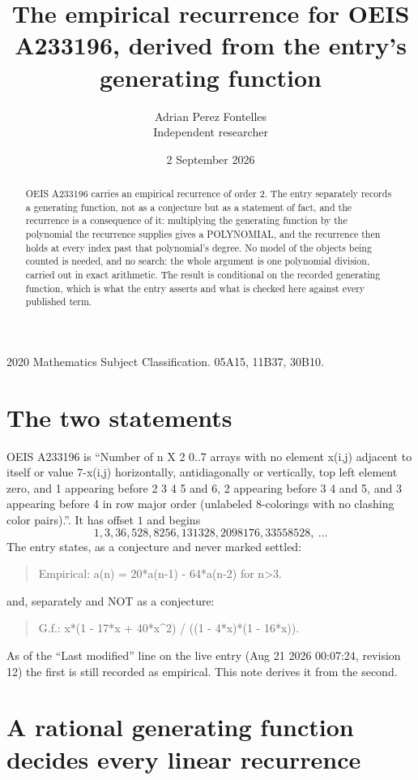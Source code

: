 \documentclass[11pt,a4paper]{article}
\title{The empirical recurrence for OEIS A233196, derived from the entry's generating function}
\author{Adrian Perez Fontelles\\ \small Independent researcher}
\date{2 September 2026}
\theoremstyle{plain}
\theoremstyle{definition}
\begin{document}
\maketitle

\begin{abstract}
OEIS A233196 carries an empirical recurrence of order $2$. The entry separately records a
generating function, not as a conjecture but as a statement of fact, and the recurrence is a
consequence of it: multiplying the generating function by the polynomial the recurrence
supplies gives a POLYNOMIAL, and the recurrence then holds at every index past that
polynomial's degree. No model of the objects being counted is needed, and no search: the
whole argument is one polynomial division, carried out in exact arithmetic. The result is
conditional on the recorded generating function, which is what the entry asserts and what is
checked here against every published term.
\end{abstract}

\noindent\small 2020 Mathematics Subject Classification. 05A15, 11B37, 30B10.\normalsize

\section{The two statements}

OEIS A233196 is ``Number of n X 2 0..7 arrays with no element x(i,j) adjacent to itself or value 7-x(i,j) horizontally, antidiagonally or vertically, top left element zero, and 1 appearing before 2 3 4 5 and 6, 2 appearing before 3 4 and 5, and 3 appearing before 4 in row major order (unlabeled 8-colorings with no clashing color pairs).''. It has offset $1$ and begins
\[
1, 3, 36, 528, 8256, 131328, 2098176, 33558528,\ \dots
\]
The entry states, as a conjecture and never marked settled:
\begin{quote}
Empirical: a(n) = 20*a(n-1) - 64*a(n-2) for n>3.
\end{quote}
and, separately and NOT as a conjecture:
\begin{quote}
G.f.: x*(1 - 17*x + 40*x\^{}2) / ((1 - 4*x)*(1 - 16*x)).
\end{quote}
As of the ``Last modified'' line on the live entry (Aug 21 2026 00:07:24, revision 12) the first is still
recorded as empirical. This note derives it from the second.

\section{A rational generating function decides every linear recurrence}
\end{document}
